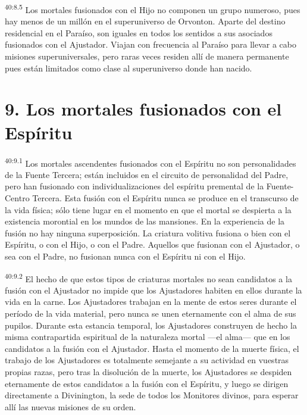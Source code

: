 \par
\textsuperscript{40:8.5} Los mortales fusionados con el Hijo no componen un grupo numeroso, pues hay menos de un millón en el superuniverso de Orvonton. Aparte del destino residencial en el Paraíso, son iguales en todos los sentidos a sus asociados fusionados con el Ajustador. Viajan con frecuencia al Paraíso para llevar a cabo misiones superuniversales, pero raras veces residen allí de manera permanente pues están limitados como clase al superuniverso donde han nacido.

\section*{9. Los mortales fusionados con el Espíritu}
\par
\textsuperscript{40:9.1} Los mortales ascendentes fusionados con el Espíritu no son personalidades de la Fuente Tercera; están incluidos en el circuito de personalidad del Padre, pero han fusionado con individualizaciones del espíritu premental de la Fuente-Centro Tercera. Esta fusión con el Espíritu nunca se produce en el transcurso de la vida física; sólo tiene lugar en el momento en que el mortal se despierta a la existencia morontial en los mundos de las mansiones. En la experiencia de la fusión no hay ninguna superposición. La criatura volitiva fusiona o bien con el Espíritu, o con el Hijo, o con el Padre. Aquellos que fusionan con el Ajustador, o sea con el Padre, no fusionan nunca con el Espíritu ni con el Hijo.

\par
\textsuperscript{40:9.2} El hecho de que estos tipos de criaturas mortales no sean candidatos a la fusión con el Ajustador no impide que los Ajustadores habiten en ellos durante la vida en la carne. Los Ajustadores trabajan en la mente de estos seres durante el período de la vida material, pero nunca se unen eternamente con el alma de sus pupilos. Durante esta estancia temporal, los Ajustadores construyen de hecho la misma contrapartida espiritual de la naturaleza mortal ---el alma--- que en los candidatos a la fusión con el Ajustador. Hasta el momento de la muerte física, el trabajo de los Ajustadores es totalmente semejante a su actividad en vuestras propias razas, pero tras la disolución de la muerte, los Ajustadores se despiden eternamente de estos candidatos a la fusión con el Espíritu, y luego se dirigen directamente a Divinington, la sede de todos los Monitores divinos, para esperar allí las nuevas misiones de su orden.

